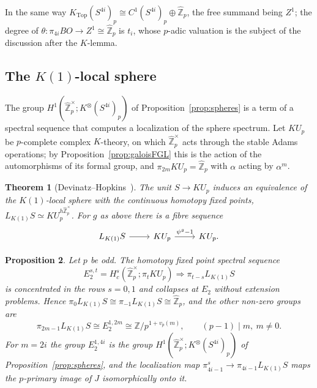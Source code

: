 \documentclass[11pt]{amsart}
\theoremstyle{plain}
\newtheorem{theorem}{Theorem}[section]
\newtheorem{proposition}[theorem]{Proposition}
\theoremstyle{definition}
\numberwithin{equation}{section}
\newcommand{\Z}{\mathbb{Z}}
\newcommand{\Zhat}{\widehat{\mathbb{Z}}}
\newcommand{\Ktop}{K_{\mathrm{Top}}}
\newcommand{\units}{^{\times}}
\begin{document}
In the same way $\Ktop(S^{4i})_p\cong C^1(S^{4i})_p\oplus\Zhat_p$, the free summand being $Z^1$; the degree of $\theta\colon\pi_{4i}BO\to Z^1\cong\Zhat_p$ is $t_i$, whose $p$-adic valuation is the subject of the discussion after the $K$-lemma.

\subsection{The $K(1)$-local sphere}
The group $H^1(\Zhat_p\units;K^\otimes(S^{4i})_p)$ of Proposition~\ref{prop:spheres} is a term of a spectral sequence that computes a localization of the sphere spectrum.
Let $KU_p$ be $p$-complete complex $K$-theory, on which $\Zhat_p\units$ acts through the stable Adams operations; by Proposition~\ref{prop:galoisFGL} this is the action of the automorphisms of its formal group, and $\pi_{2m}KU_p=\Zhat_p$ with $\alpha$ acting by $\alpha^m$.

\begin{theorem}[Devinatz--Hopkins~\cite{DevinatzHopkins}]
The unit $S\to KU_p$ induces an equivalence of the $K(1)$-local sphere with the continuous homotopy fixed points, $L_{K(1)}S\simeq KU_p^{h\Zhat_p\units}$.
For $g$ as above there is a fibre sequence
\[
\begin{tikzcd}
L_{K(1)}S\arrow[r] & KU_p\arrow[r,"\psi^g-1"] & KU_p .
\end{tikzcd}
\]
\end{theorem}

\begin{proposition}\label{prop:K1sphere}
Let $p$ be odd.
The homotopy fixed point spectral sequence
\[
E_2^{s,t}=H^s_c(\Zhat_p\units;\pi_tKU_p)\Longrightarrow\pi_{t-s}L_{K(1)}S
\]
is concentrated in the rows $s=0,1$ and collapses at $E_2$ without extension problems.
Hence $\pi_0L_{K(1)}S\cong\pi_{-1}L_{K(1)}S\cong\Zhat_p$, and the other non-zero groups are
\[
\pi_{2m-1}L_{K(1)}S\cong E_2^{1,2m}\cong\Z/p^{1+v_p(m)},\qquad (p-1)\mid m,\ m\ne0 .
\]
For $m=2i$ the group $E_2^{1,4i}$ is the group $H^1(\Zhat_p\units;K^\otimes(S^{4i})_p)$ of Proposition~\ref{prop:spheres}, and the localization map $\pi^s_{4i-1}\to\pi_{4i-1}L_{K(1)}S$ maps the $p$-primary image of $J$ isomorphically onto it.
\end{proposition}
\end{document}
